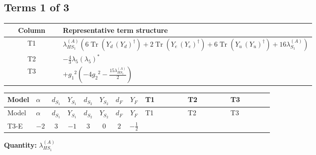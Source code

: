 \documentclass[8pt]{article}
\begin{document}
\begin{landscape}
\subsection*{Terms 1 of 3}
\begin{center}
\begin{tabular}{@{}c >{\raggedright\arraybackslash}p{0.82\linewidth}@{}}
\toprule
Column & Representative term structure \\
\midrule
T1 & \(\displaystyle {\lambda_{HS_1}^{(A)}} (6 \operatorname{Tr}\!\left({Y_d}\,\left({Y_d}\right)^{\dagger}\right)+2 \operatorname{Tr}\!\left({Y_e}\,\left({Y_e}\right)^{\dagger}\right)+6 \operatorname{Tr}\!\left({Y_u}\,\left({Y_u}\right)^{\dagger}\right)+16 {\lambda_{S_1}^{(A)}})\) \\
\midrule
T2 & \(\displaystyle -\frac{4}{3} {\lambda_5} \left({\lambda_5}\right)^{*}\) \\
\midrule
T3 & \(\displaystyle +{g_1}^2 \left(-4 {g_2}^2-\frac{15 {\lambda_{HS_1}^{(A)}}}{2}\right)\) \\
\midrule
\bottomrule
\end{tabular}
\end{center}
\smallskip
\tiny
\begin{longtable}{@{}llcccccc >{\raggedright\arraybackslash}p{0.21\linewidth} >{\raggedright\arraybackslash}p{0.21\linewidth} >{\raggedright\arraybackslash}p{0.21\linewidth}@{}}
\toprule
Model & $\alpha$ & $d_{S_1}$ & $Y_{S_1}$ & $d_{S_2}$ & $Y_{S_2}$ & $d_F$ & $Y_F$ & T1 & T2 & T3 \\
\midrule
\endfirsthead
\toprule
Model & $\alpha$ & $d_{S_1}$ & $Y_{S_1}$ & $d_{S_2}$ & $Y_{S_2}$ & $d_F$ & $Y_F$ & T1 & T2 & T3 \\
\midrule
\endhead
T3-E & $-2$ & $3$ & $-1$ & $3$ & $0$ & $2$ & $-\frac{1}{2}$ & \scriptsize\adjustbox{max width=\linewidth}{$\begin{gathered} {\lambda_{HS_1}^{(A)}} (6 \operatorname{Tr}\!\left({Y_d}\,\left({Y_d}\right)^{\dagger}\right)+2 \operatorname{Tr}\!\left({Y_e}\,\left({Y_e}\right)^{\dagger}\right)+6 \operatorname{Tr}\!\left({Y_u}\,\left({Y_u}\right)^{\dagger}\right)+16 {\lambda_{S_1}^{(A)}})\end{gathered}$} & \scriptsize\adjustbox{max width=\linewidth}{$\begin{gathered} -\frac{4}{3} {\lambda_5} \left({\lambda_5}\right)^{*}\end{gathered}$} & \scriptsize\adjustbox{max width=\linewidth}{$\begin{gathered} +{g_1}^2 \left(-4 {g_2}^2-\frac{15 {\lambda_{HS_1}^{(A)}}}{2}\right)\end{gathered}$} \\
\midrule
\bottomrule
\end{longtable}
\clearpage
\noindent\textbf{Quantity: }$\lambda_{HS_1}^{(A)}$\par\smallskip

\end{landscape}
\end{document}
